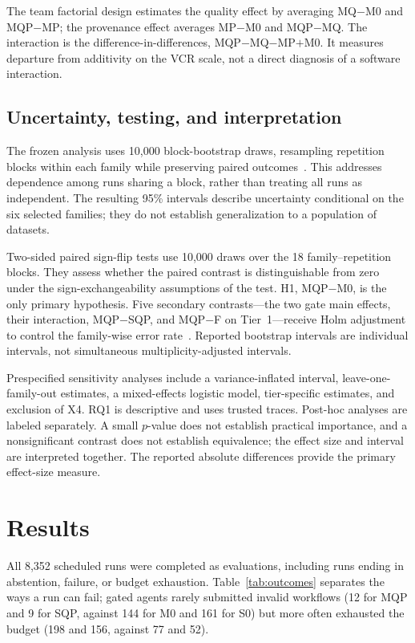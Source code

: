 \documentclass[conference]{IEEEtran}
\newcommand{\sys}[1]{\textsf{#1}}
\begin{document}
The team factorial design estimates the quality effect by averaging \sys{MQ}$-$\sys{M0} and \sys{MQP}$-$\sys{MP}; the provenance effect averages \sys{MP}$-$\sys{M0} and \sys{MQP}$-$\sys{MQ}. The interaction is the difference-in-differences, \sys{MQP}$-$\sys{MQ}$-$\sys{MP}$+$\sys{M0}. It measures departure from additivity on the VCR scale, not a direct diagnosis of a software interaction.

\subsection{Uncertainty, testing, and interpretation}
The frozen analysis uses 10,000 block-bootstrap draws, resampling repetition blocks within each family while preserving paired outcomes~\cite{efron1979bootstrap,saravanan2020hierarchical}. This addresses dependence among runs sharing a block, rather than treating all runs as independent. The resulting 95\% intervals describe uncertainty conditional on the six selected families; they do not establish generalization to a population of datasets.

Two-sided paired sign-flip tests use 10,000 draws over the 18 family--repetition blocks. They assess whether the paired contrast is distinguishable from zero under the sign-exchangeability assumptions of the test. H1, \sys{MQP}$-$\sys{M0}, is the only primary hypothesis. Five secondary contrasts---the two gate main effects, their interaction, \sys{MQP}$-$\sys{SQP}, and \sys{MQP}$-$\sys{F} on Tier~1---receive Holm adjustment to control the family-wise error rate~\cite{holm1979}. Reported bootstrap intervals are individual intervals, not simultaneous multiplicity-adjusted intervals.

Prespecified sensitivity analyses include a variance-inflated interval, leave-one-family-out estimates, a mixed-effects logistic model, tier-specific estimates, and exclusion of X4. RQ1 is descriptive and uses trusted traces. Post-hoc analyses are labeled separately. A small $p$-value does not establish practical importance, and a nonsignificant contrast does not establish equivalence; the effect size and interval are interpreted together. The reported absolute differences provide the primary effect-size measure.

\section{Results}
\label{sec:results}
All 8,352 scheduled runs were completed as evaluations, including runs ending in abstention, failure, or budget exhaustion. Table~\ref{tab:outcomes} separates the ways a run can fail; gated agents rarely submitted invalid workflows (12 for \sys{MQP} and 9 for \sys{SQP}, against 144 for \sys{M0} and 161 for \sys{S0}) but more often exhausted the budget (198 and 156, against 77 and 52).
\end{document}
